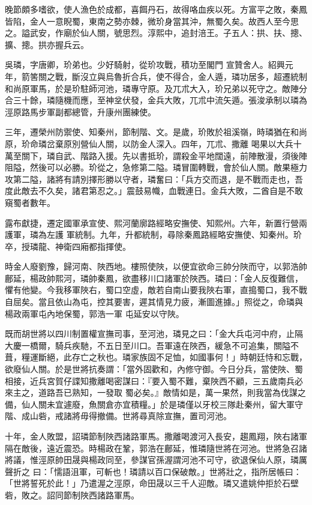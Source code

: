 \begin{pinyinscope}
 晚節頗多嗜欲，使人漁色於成都，喜餌丹石，故得咯血疾以死。方富平之敗，秦鳳皆陷，金人一意睨蜀，東南之勢亦棘，微玠身當其沖，無蜀久矣。故西人至今思之。謚武安，作廟於仙人關，號思烈。淳熙中，追封涪王。子五人：拱、扶、摠、擴、摠。拱亦握兵云。



 吳璘，字唐卿，玠弟也。少好騎射，從玠攻戰，積功至閣門
 宣贊舍人。紹興元年，箭筈關之戰，斷沒立與烏魯折合兵，使不得合，金人遁，璘功居多，超遷統制和尚原軍馬，於是玠駐師河池，璘專守原。及兀朮大入，玠兄弟以死守之。敵陣分合三十餘，璘隨機而應，至神坌伏發，金兵大敗，兀朮中流矢遁。張浚承制以璘為涇原路馬步軍副都總管，升康州團練使。



 三年，遷榮州防禦使、知秦州，節制階、文。是歲，玠敗於祖溪嶺，時璘猶在和尚原，玠命璘岔棄原別營仙人關，以防金人深入。四年，兀朮、撒離
 喝果以大兵十萬至關下，璘自武、階路入援。先以書抵玠，謂殺金平地闊遠，前陣散漫，須後陣阻隘，然後可以必勝。玠從之，急修第二隘。璘冒圍轉戰，會於仙人關。敵果極力攻第二隘，諸將有請別擇形勝以守者，璘奮曰：「兵方交而退，是不戰而走也，吾度此敵去不久矣，諸君第忍之。」震鼓易幟，血戰連日。金兵大敗，二酋自是不敢窺蜀者數年。



 露布獻捷，遷定國軍承宣使、熙河蘭廓路經略安撫使、知熙州。六年，新置行營兩護軍，璘為左護
 軍統制。九年，升都統制，尋除秦鳳路經略安撫使、知秦州。玠卒，授璘龍、神衛四廂都指揮使。



 時金人廢劉豫，歸河南、陜西地。樓照使陜，以便宜欲命三帥分陜而守，以郭浩帥鄜延，楊政帥熙河，璘帥秦鳳，欲盡移川口諸軍於陜西。璘曰：「金人反復難信，懼有他變。今我移軍陜右，蜀口空虛，敵若自南山要我陜右軍，直搗蜀口，我不戰自屈矣。當且依山為屯，控其要害，遲其情見力疲，漸圖進據。」照從之，命璘與楊政兩軍屯內地保蜀，郭浩一軍
 屯延安以守陜。



 既而胡世將以四川制置權宣撫司事，至河池，璘見之曰：「金大兵屯河中府，止隔大慶一橋爾，騎兵疾馳，不五日至川口。吾軍遠在陜西，緩急不可追集，關隘不葺，糧運斷絕，此存亡之秋也。璘家族固不足恤，如國事何！」時朝廷恃和忘戰，欲廢仙人關。於是世將抗奏謂：「當外固歡和，內修守御。今日分兵，當使陜、蜀相接，近兵宮賀仔諜知撒離喝密謀曰：『要入蜀不難，棄陜西不顧，三五歲南兵必來主之，道路吾已熟知，一發取
 蜀必矣。』敵情如是，萬一果然，則我當為伐謀之備，仙人關未宜遽廢，魚關倉亦宜積糧。」於是璘僅以牙校三隊赴秦州，留大軍守階、成山砦，戒諸將毋得撤備。世將尋真除宣撫，置司河池。



 十年，金人敗盟，詔璘節制陜西諸路軍馬。撒離喝渡河入長安，趨鳳翔，陜右諸軍隔在敵後，遠近震恐。時楊政在鞏，郭浩在鄜延，惟璘隨世將在河池。世將急召諸將議，惟涇原帥田晟與楊政同至，參謀官孫渥謂河池不可守，欲退保仙人原，璘厲聲折之
 曰：「懦語沮軍，可斬也！璘請以百口保破敵。」世將壯之，指所居帳曰：「世將誓死於此！」乃遣渥之涇原，命田晟以三千人迎敵。璘又遣姚仲拒於石壁砦，敗之。詔同節制陜西諸路軍馬。




\end{pinyinscope}
